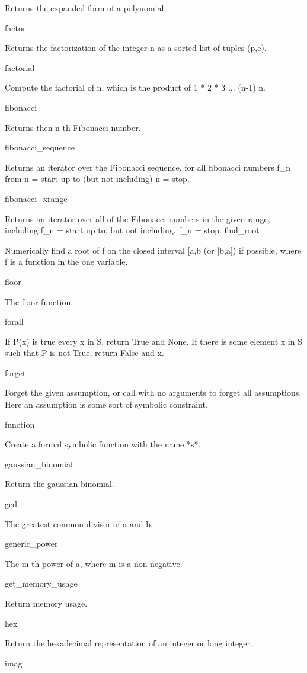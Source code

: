 \documentclass[12pt,oneside]{book}
\begin{document}
Returns the expanded form of a polynomial.

factor

Returns the factorization of the integer n as a sorted list of tuples (p,e).

factorial

Compute the factorial of n, which is the product of 1 * 2 * 3 ... (n{}-1) n.

fibonacci

Returns then n{}-th Fibonacci number.

fibonacci\_sequence

Returns an iterator over the Fibonacci sequence, for all fibonacci numbers f\_n from n = start up to (but not including) n = stop.

fibonacci\_xrange

Returns an iterator over all of the Fibonacci numbers in the given range, including f\_n = start up to, but not including, f\_n = stop.  find\_root

Numerically find a root of f on the closed interval [a,b (or [b,a]) if possible, where f is a function in the one variable.

floor

The floor function.

forall

If P(x) is true every x in S, return True and None. If there is some element x in S such that P is not True, return False and x.

forget

Forget the given assumption, or call with no arguments to forget all assumptions. Here an assumption is some sort of symbolic constraint.

function

Create a formal symbolic function with the name *s*.

gaussian\_binomial

Return the gaussian binomial.

gcd

The greatest common divisor of a and b.

generic\_power

The m{}-th power of a, where m is a non{}-negative.

get\_memory\_usage

Return memory usage.

hex

Return the hexadecimal representation of an integer or long integer.

imag
\end{document}
